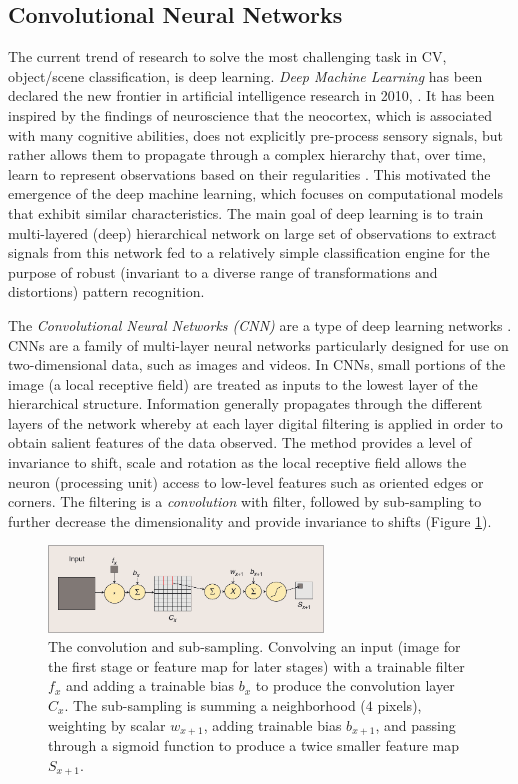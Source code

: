 \subsection{Convolutional Neural Networks}\label{subsec:cnn}

The current trend of research to solve the most challenging task in CV, object/scene classification, is deep learning. {\em Deep Machine Learning} has been declared the new frontier in artificial intelligence research in 2010, \cite{Arel:2010}. It has been inspired by the findings of neuroscience that the neocortex, which is associated with many cognitive abilities, does not explicitly pre-process sensory signals, but rather allows them to propagate through a complex hierarchy that, over time, learn to represent observations based on their regularities \cite{Lee1998,Lee03}. This  motivated the emergence of the deep machine learning, which focuses on computational models that exhibit similar characteristics. The main goal of deep learning is to train multi-layered (deep) hierarchical network on large set of observations to extract signals from this network fed to a relatively simple classification engine for the purpose of robust (invariant to a diverse range of transformations and distortions) pattern recognition.

The {\em Convolutional Neural Networks (CNN)} are a type of deep learning networks \cite{Bengio:2009}. CNNs are a family of multi-layer neural networks particularly designed for use on two-dimensional data, such as images and videos. In CNNs, small portions of the image (a local receptive field) are treated as inputs to the lowest layer of the hierarchical structure. Information generally propagates
through the different layers of the network whereby at each layer digital filtering is applied in order to obtain salient features of the data observed. The method provides a level of invariance to
shift, scale and rotation as the local receptive field allows the neuron (processing unit) access to low-level features such as oriented edges or corners. The filtering is a {\em convolution} with filter, followed by sub-sampling to further decrease the dimensionality and provide invariance to shifts (Figure \ref{fig:conv}).

\begin{figure}[H]
\begin{center}
\includegraphics[width=0.65\textwidth]{fig/Conv}
\end{center}
\caption{The convolution and sub-sampling. Convolving an input (image for the first stage or feature map for later stages) with a trainable filter $f_x$ and adding a trainable bias $b_x$
to produce the convolution layer $C_x$. The sub-sampling is summing a neighborhood ($4$ pixels), weighting by scalar $w_{x+1}$, adding trainable bias $b_{x+1}$, and
passing through a sigmoid function to produce a twice smaller feature map $S_{x+1}$.}
\label{fig:conv}
\end{figure}


